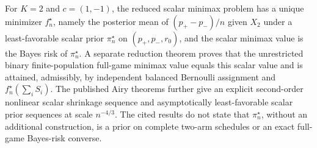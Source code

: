For \(K=2\) and \(c=(1,-1)\), the reduced scalar minimax problem has a unique minimizer \(f_n^\star\), namely the posterior mean of \((p_+-p_-)/n\) given \(X_2\) under a least-favorable scalar prior \(\pi_n^\star\) on \((p_+,p_-,r_0)\), and the scalar minimax value is the Bayes risk of \(\pi_n^\star\). A separate reduction theorem proves that the unrestricted binary finite-population full-game minimax value equals this scalar value and is attained, admissibly, by independent balanced Bernoulli assignment and \(f_n^\star(\sum_i S_i)\). The published Airy theorems further give an explicit second-order nonlinear scalar shrinkage sequence and asymptotically least-favorable scalar prior sequences at scale \(n^{-4/3}\). The cited results do not state that \(\pi_n^\star\), without an additional construction, is a prior on complete two-arm schedules or an exact full-game Bayes-risk converse.